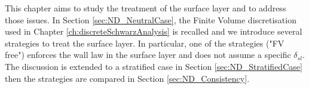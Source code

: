 This chapter aims to study the treatment of
the surface layer and to address those issues.
In Section \ref{sec:ND_NeutralCase}, the Finite Volume
discretisation used in Chapter \ref{ch:discreteSchwarzAnalysis}
is recalled and we introduce several strategies to treat
the surface layer.
In particular, one of the strategies ("FV free") enforces
the wall law in the surface layer and does not
assume a specific $\delta_{sl}$.
The discussion is extended to a stratified case
in Section \ref{sec:ND_StratifiedCase} then
the strategies are compared in Section \ref{sec:ND_Consistency}.

